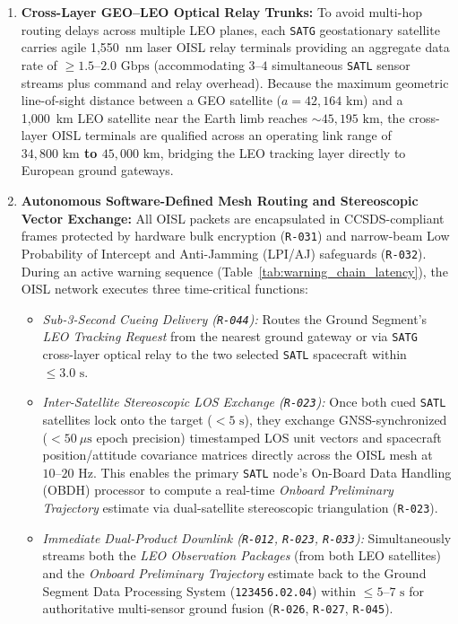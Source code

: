 \documentclass[11pt,a4paper]{article}
\providecommand{\abbr}[1]{#1}
\begin{document}
\begin{enumerate}
\begin{itemize}
    \end{itemize}
    \item \textbf{Cross-Layer \abbr{GEO}--\abbr{LEO} Optical Relay Trunks:} To avoid multi-hop routing delays across multiple \abbr{LEO} planes, each \texttt{SATG} geostationary satellite carries agile 1,550~nm laser \abbr{OISL} relay terminals providing an aggregate data rate of \textbf{$\ge 1.5\text{--}2.0\text{ Gbps}$} (accommodating $3\text{--}4$ simultaneous \texttt{SATL} sensor streams plus command and relay overhead). Because the maximum geometric line-of-sight distance between a \abbr{GEO} satellite ($a = 42{,}164\text{ km}$) and a 1,000~km \abbr{LEO} satellite near the Earth limb reaches $\sim 45{,}195\text{ km}$, the cross-layer \abbr{OISL} terminals are qualified across an operating link range of \textbf{$34{,}800\text{ km}$ to $45{,}000\text{ km}$}, bridging the \abbr{LEO} tracking layer directly to European ground gateways.
    \item \textbf{Autonomous Software-Defined Mesh Routing and Stereoscopic Vector Exchange:} All \abbr{OISL} packets are encapsulated in \abbr{CCSDS}-compliant frames protected by hardware bulk encryption (\texttt{R-031}) and narrow-beam Low Probability of Intercept and Anti-Jamming (\abbr{LPI}/\abbr{AJ}) safeguards (\texttt{R-032}). During an active warning sequence (Table~\ref{tab:warning_chain_latency}), the \abbr{OISL} network executes three time-critical functions:
    \begin{itemize}
        \item \emph{Sub-3-Second Cueing Delivery (\texttt{R-044}):} Routes the Ground Segment's \emph{LEO Tracking Request} from the nearest ground gateway or via \texttt{SATG} cross-layer optical relay to the two selected \texttt{SATL} spacecraft within $\le 3.0\text{ s}$.
        \item \emph{Inter-Satellite Stereoscopic \abbr{LOS} Exchange (\texttt{R-023}):} Once both cued \texttt{SATL} satellites lock onto the target ($< 5\text{ s}$), they exchange GNSS-synchronized ($< 50~\mu\mathrm{s}$ epoch precision) timestamped \abbr{LOS} unit vectors and spacecraft position/attitude covariance matrices directly across the \abbr{OISL} mesh at $10\text{--}20\text{ Hz}$. This enables the primary \texttt{SATL} node's On-Board Data Handling (\abbr{OBDH}) processor to compute a real-time \emph{Onboard Preliminary Trajectory} estimate via dual-satellite stereoscopic triangulation (\texttt{R-023}).
        \item \emph{Immediate Dual-Product Downlink (\texttt{R-012}, \texttt{R-023}, \texttt{R-033}):} Simultaneously streams both the \emph{LEO Observation Packages} (from both \abbr{LEO} satellites) and the \emph{Onboard Preliminary Trajectory} estimate back to the Ground Segment Data Processing System (\texttt{123456.02.04}) within $\le 5\text{--}7\text{ s}$ for authoritative multi-sensor ground fusion (\texttt{R-026}, \texttt{R-027}, \texttt{R-045}).
    \end{itemize}
\end{enumerate}
\end{document}
